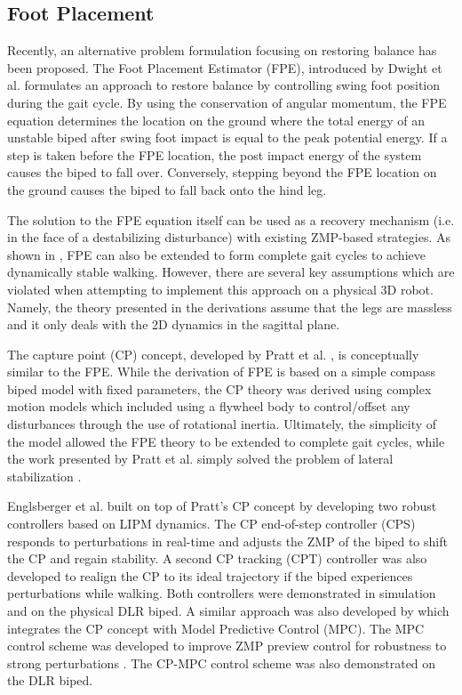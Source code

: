 \subsection{Foot Placement} %
\label{sub:related_foot_placement}
Recently, an alternative problem formulation focusing on restoring balance has been proposed. The Foot Placement Estimator (FPE), introduced by Dwight et al. \cite{Wight:2008ii} formulates an approach to restore balance by controlling swing foot position during the gait cycle. By using the conservation of angular momentum, the FPE equation determines the location on the ground where the total energy of an unstable biped after swing foot impact is equal to the peak potential energy. If a step is taken before the FPE location, the post impact energy of the system causes the biped to fall over. Conversely, stepping beyond the FPE location on the ground causes the biped to fall back onto the hind leg.

The solution to the FPE equation itself can be used as a recovery mechanism (i.e. in the face of a destabilizing disturbance) with existing ZMP-based strategies. As shown in \cite{Wight:2008ii,Wight:2008vt}, FPE can also be extended to form complete gait cycles to achieve dynamically stable walking. However, there are several key assumptions which are violated when attempting to implement this approach on a physical 3D robot. Namely, the theory presented in the derivations assume that the legs are massless and it only deals with the 2D dynamics in the sagittal plane.

The capture point (CP) concept, developed by Pratt et al. \cite{Pratt:2006vy}, is conceptually similar to the FPE. While the derivation of FPE is based on a simple compass biped model with fixed parameters, the CP theory was derived using complex motion models which included using a flywheel body to control/offset any disturbances through the use of rotational inertia. Ultimately, the simplicity of the model allowed the FPE theory to be extended to complete gait cycles, while the work presented by Pratt et al. simply solved the problem of lateral stabilization \cite{Wight:2008ii}.

Englsberger et al. built on top of Pratt's CP concept \cite{Englsberger:2011jx} by developing two robust controllers based on LIPM dynamics. The CP end-of-step controller (CPS) responds to perturbations in real-time and adjusts the ZMP of the biped to shift the CP and regain stability. A second CP tracking (CPT) controller was also developed to realign the CP to its ideal trajectory if the biped experiences perturbations while walking. Both controllers were demonstrated in simulation and on the physical DLR biped. A similar approach was also developed by \cite{Krause:2012vo} which integrates the CP concept with Model Predictive Control (MPC). The MPC control scheme was developed to improve ZMP preview control for robustness to strong perturbations \cite{Wieber2006}. The CP-MPC control scheme was also demonstrated on the DLR biped.


